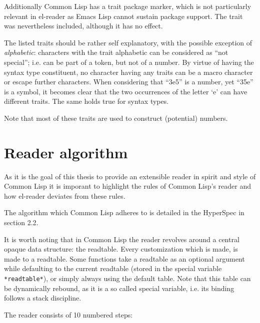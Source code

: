 \documentclass[a4paper,10pt,twoside]{report}
\newcommand{\el}{Emacs Lisp}
\newcommand{\cl}{Common Lisp}
\newcommand{\elr}{el-reader}
\newcommand{\sym}[1]{\texttt{#1}}
\begin{document}
Additionally \cl{} has a trait package marker, which is not particularly
relevant in \elr{} as \el{} cannot sustain package support.  The trait was
nevertheless included, although it has no effect.

The listed traits should be rather self explanatory, with the possible exception
of \emph{alphabetic}: characters with the trait alphabetic can be considered as
``not special''; i.e. can be part of a token, but not of a number.  By virtue of
having the syntax type constituent, no character having any traits can be a
macro character or escape further characters.  When considering that ``3e5'' is
a number, yet ``35e'' is a symbol, it becomes clear that the two occurrences of
the letter `e' can have different traits.  The same holds true for syntax types.

Note that most of these traits are used to construct (potential) numbers.



\section{Reader algorithm}
\label{sec:read-algo}

As it is the goal of this thesis to provide an extensible reader in spirit and
style of \cl{} it is imporant to highlight the rules of \cl{}’s reader and how
\elr{} deviates from these rules.

The algorithm which \cl{} adheres to is detailed in the HyperSpec in section
2.2\cite{hyperspec}.

It is worth noting that in \cl{} the reader revolves around a central opaque
data structure: the readtable.  Every customization which is made, is made to a
readtable.  Some functions take a readtable as an optional argument while
defaulting to the current readtable (stored in the special variable
\sym{*readtable*}), or simply always using the default table.  Note that this
table can be dynamically rebound, as it is a so called special variable,
i.e. its binding follows a stack discipline.

The reader consists of 10 numbered steps:
\end{document}

